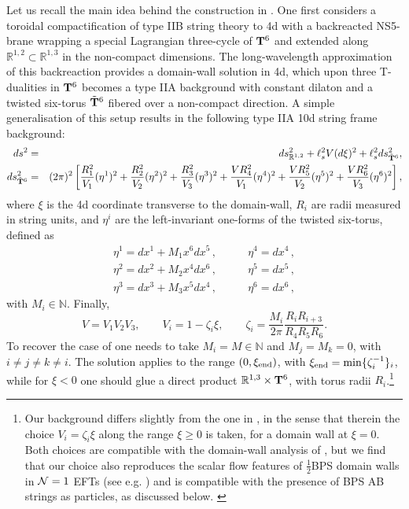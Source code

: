 \documentclass[11pt]{article}
\def\CN {{\cal N}}
\def\be{\begin{equation}}
\def\ee{\end{equation}}
\def\bea{\begin{eqnarray}}
\def\eea{\end{eqnarray}}
\def\oh{\frac{1}{2}}
\newcommand{\IR}{\mathbb{R}}
\begin{document}
Let us recall the main idea behind the construction in \cite{Gurrieri:2002wz}. One first considers a toroidal compactification of type IIB string theory to 4d with a backreacted NS5-brane wrapping a special Lagrangian three-cycle of ${\bf T}^6$ and extended along $\IR^{1,2} \subset \IR^{1,3}$ in the non-compact dimensions. The long-wavelength approximation  of this backreaction provides a domain-wall solution in 4d, which upon three T-dualities in ${\bf T}^6$ becomes a type IIA background with constant dilaton and a twisted six-torus $\tilde{\bf T}^6$ fibered over a non-compact direction. A simple generalisation of this setup results in the following type IIA 10d string frame background:
\bea
\label{SU3ex}
ds^2 &= &ds^2_{\IR^{1,2}}+ \ell_s^2 V(d\xi)^2 + \ell_s^2 ds^2_{\tilde{\bf T}^6} , \\ 
ds^2_{\tilde{\bf T}^6}& = &(2\pi)^2 \left[\frac{R_1^2}{V_1}(\eta^1)^2+\frac{R_2^2}{V_2}(\eta^2)^2+\frac{R_3^2}{V_3}(\eta^3)^2+\frac{V R_4^2}{V_1}(\eta^4)^2+\frac{V R_5^2}{V_2}(\eta^5)^2+\frac{V R_6^2}{V_3}(\eta^6)^2 \right] ,
\label{SU3exb}
\eea
where $\xi$ is the 4d coordinate transverse to the domain-wall, $R_i$ are radii measured in string units, and $\eta^i$ are the left-invariant one-forms of the twisted six-torus, defined as
\begin{equation}
\begin{array}{ll}
\eta^1= d x^1 + M_1  x^6 d x^5   \,, & \qquad \eta^4= d x^4 \,, \\
\eta^2= dx^2 + M_2 x^4 d x^6  \,, & \qquad \eta^5= d x^5 \,, \\
\eta^3= d x^3 + M_3 x^5 d x^4   \,, & \qquad \eta^6=  d x^6 \, ,
\end{array}
\label{etas}
\end{equation}
with $M_i \in \mathbb{N}$. Finally, 
\be
V = V_1V_2V_3 , \qquad V_i = 1 - \zeta_i \xi , \qquad \zeta_i = \frac{M_i}{2\pi} \frac{R_i R_{i+3}}{R_4R_5R_6} .
\label{Vis}
\ee
To recover the case of \cite{Gurrieri:2002wz} one needs to take $M_i=M \in \mathbb{N}$ and $M_j= M_k=0$, with $i \neq j \neq k \neq i$. The solution applies to the range $(0,\xi_{\rm end})$, with $\xi_{\rm end} = {\rm min} \{\zeta_i^{-1}\}_i$, while for $\xi<0$ one should glue a direct product $\IR^{1,3} \times {\bf T}^6$, with torus radii $R_i$.\footnote{Our background differs slightly from the one  in \cite{Gurrieri:2002wz}, in the sense that therein the choice $V_i = \zeta_i \xi$ along the range $\xi \geq 0$ is taken, for a domain wall  at $\xi=0$. Both choices are compatible with the domain-wall analysis of \cite{Curio:2000sc,Behrndt:2001qa,Behrndt:2001mx}, but we find that our choice also reproduces the scalar flow features of $\oh$BPS domain walls in $\CN=1$ EFTs (see e.g.  \cite[section 4.3.2]{Lanza:2020qmt}) and is compatible with the presence of BPS AB strings as particles, as discussed below. \label{ft:dw}}
\end{document}
